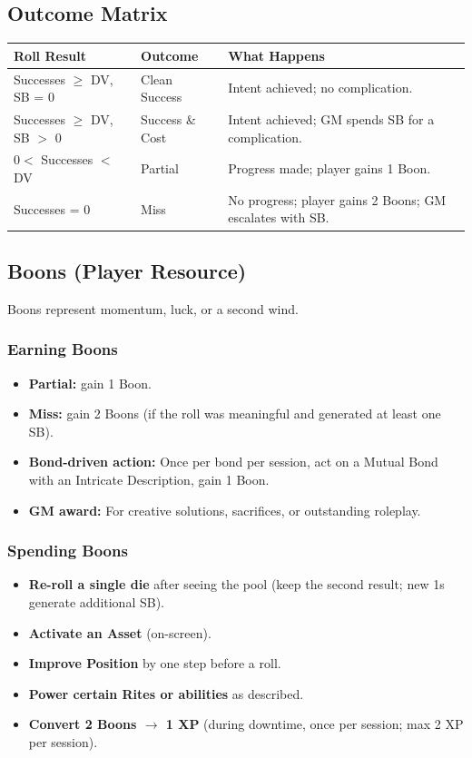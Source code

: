 \subsection{Outcome Matrix}

\begin{tabular}{@{}lp{2.2cm}p{7cm}@{}}
\toprule
\textbf{Roll Result} & \textbf{Outcome} & \textbf{What Happens} \\
\midrule
Successes $\ge$ DV, SB = 0 & Clean Success & Intent achieved; no complication. \\
Successes $\ge$ DV, SB $>$ 0 & Success \& Cost & Intent achieved; GM spends SB for a complication. \\
$0 <$ Successes $<$ DV & Partial & Progress made; player gains 1 Boon. \\
Successes = 0 & Miss & No progress; player gains 2 Boons; GM escalates with SB. \\
\bottomrule
\end{tabular}

\subsection{Boons (Player Resource)}

Boons represent momentum, luck, or a second wind.

\subsubsection{Earning Boons}
\begin{itemize}
  \item \textbf{Partial:} gain 1 Boon.
  \item \textbf{Miss:} gain 2 Boons (if the roll was meaningful and generated at least one SB).
  \item \textbf{Bond-driven action:} Once per bond per session, act on a Mutual Bond with an Intricate Description, gain 1 Boon.
  \item \textbf{GM award:} For creative solutions, sacrifices, or outstanding roleplay.
\end{itemize}

\subsubsection{Spending Boons}
\begin{itemize}
  \item \textbf{Re-roll a single die} after seeing the pool (keep the second result; new 1s generate additional SB).
  \item \textbf{Activate an Asset} (on-screen).
  \item \textbf{Improve Position} by one step before a roll.
  \item \textbf{Power certain Rites or abilities} as described.
  \item \textbf{Convert 2 Boons $\rightarrow$ 1 XP} (during downtime, once per session; max 2 XP per session).
\end{itemize}

